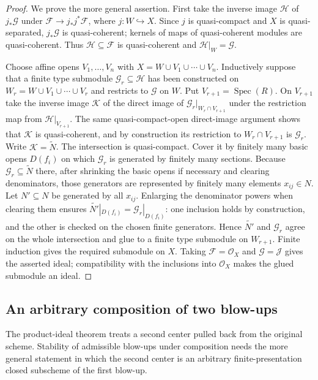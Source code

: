 \begin{proof}
  We prove the more general assertion.  First take the inverse image
  $\mathcal H$ of $j_*\mathcal G$ under
  $\mathcal F\to j_*j^*\mathcal F$, where $j\colon W\hookrightarrow X$.
  Since $j$ is quasi-compact and $X$ is quasi-separated, $j_*\mathcal G$ is
  quasi-coherent; kernels of maps of quasi-coherent modules are
  quasi-coherent.  Thus $\mathcal H\subseteq\mathcal F$ is quasi-coherent and
  $\mathcal H|_W=\mathcal G$.

  Choose affine opens $V_1,\ldots,V_n$ with
  $X=W\cup V_1\cup\cdots\cup V_n$.  Inductively suppose that a finite type
  submodule $\mathcal G_r\subseteq\mathcal H$ has been constructed on
  $W_r=W\cup V_1\cup\cdots\cup V_r$ and restricts to $\mathcal G$ on $W$.
  Put $V_{r+1}=\operatorname{Spec}(R)$.  On $V_{r+1}$ take the inverse image
  $\mathcal K$ of the direct image of
  $\mathcal G_r|_{W_r\cap V_{r+1}}$ under the restriction map from
  $\mathcal H|_{V_{r+1}}$.  The same quasi-compact-open direct-image argument
  shows that $\mathcal K$ is quasi-coherent, and by construction its
  restriction to $W_r\cap V_{r+1}$ is $\mathcal G_r$.  Write
  $\mathcal K=\widetilde N$.  The intersection is quasi-compact.  Cover it by
  finitely many basic opens $D(f_i)$ on which $\mathcal G_r$ is generated by
  finitely many sections.  Because $\mathcal G_r\subseteq\widetilde N$ there,
  after shrinking the basic opens if necessary and clearing denominators, those
  generators are represented by finitely many elements $x_{ij}\in N$.  Let
  $N'\subseteq N$ be generated by all $x_{ij}$.  Enlarging the denominator
  powers when clearing them ensures
  $\widetilde{N'}|_{D(f_i)}=\mathcal G_r|_{D(f_i)}$: one inclusion holds by
  construction, and the other is checked on the chosen finite generators.
  Hence $\widetilde{N'}$ and $\mathcal G_r$ agree on the whole intersection and
  glue to a finite type submodule on $W_{r+1}$.  Finite induction gives the
  required submodule on $X$.  Taking $\mathcal F=\mathcal O_X$ and
  $\mathcal G=\mathcal J$ gives the asserted ideal; compatibility with the
  inclusions into $\mathcal O_X$ makes the glued submodule an ideal.
\end{proof}

\subsection{An arbitrary composition of two blow-ups}

The product-ideal theorem treats a second center pulled back from the original
scheme.  Stability of admissible blow-ups under composition needs the more
general statement in which the second center is an arbitrary finite-presentation
closed subscheme of the first blow-up.

